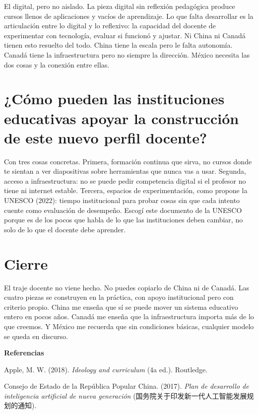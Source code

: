 \documentclass[12pt,a4paper]{article}
\newcommand{\zh}[1]{{\cjkfont #1}}
\begin{document}
El digital, pero no aislado. La pieza digital sin reflexión pedagógica produce cursos llenos de aplicaciones y vacíos de aprendizaje. Lo que falta desarrollar es la articulación entre lo digital y lo reflexivo: la capacidad del docente de experimentar con tecnología, evaluar si funcionó y ajustar. Ni China ni Canadá tienen esto resuelto del todo. China tiene la escala pero le falta autonomía. Canadá tiene la infraestructura pero no siempre la dirección. México necesita las dos cosas y la conexión entre ellas.

\section*{¿Cómo pueden las instituciones educativas apoyar la construcción de este nuevo perfil docente?}

Con tres cosas concretas. Primera, formación continua que sirva, no cursos donde te sientan a ver diapositivas sobre herramientas que nunca vas a usar. Segunda, acceso a infraestructura: no se puede pedir competencia digital si el profesor no tiene ni internet estable. Tercera, espacios de experimentación, como propone la UNESCO (2022): tiempo institucional para probar cosas sin que cada intento cuente como evaluación de desempeño. Escogí este documento de la UNESCO porque es de los pocos que habla de lo que las instituciones deben cambiar, no solo de lo que el docente debe aprender.

\section*{Cierre}

El traje docente no viene hecho. No puedes copiarlo de China ni de Canadá. Las cuatro piezas se construyen en la práctica, con apoyo institucional pero con criterio propio. China me enseña que sí se puede mover un sistema educativo entero en pocos años. Canadá me enseña que la infraestructura importa más de lo que creemos. Y México me recuerda que sin condiciones básicas, cualquier modelo se queda en discurso.

\newpage
\begin{center}
{\large\bfseries Referencias}
\end{center}
\vspace{0.5cm}

\noindent Apple, M. W. (2018). \textit{Ideology and curriculum} (4a ed.). Routledge.

\vspace{0.4cm}
\noindent Consejo de Estado de la República Popular China. (2017). \textit{Plan de desarrollo de inteligencia artificial de nueva generación} (\zh{国务院关于印发新一代人工智能发展规划的通知}).
\end{document}
